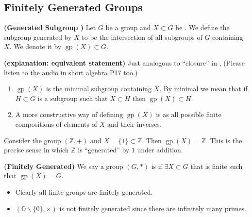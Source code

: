 \documentclass{article}
\newcommand{\bfs}[1]{\textbf{({#1}) }}
\newcommand{\gp}{\operatorname{gp}}
\begin{document}
\subsection{Finitely Generated Groups}\label{sec:finite}
\begin{defa}{\bfs{Generated Subgroup }}
    Let $G$ be a group and $X \subset G$ be . We define the subgroup generated by ${X}$ to be the intersection of all subgroups of $G$ containing $X .$ We denote it by $\gp(X) \subset G$.
\end{defa} 
\begin{rema}{\bfs{explanation: equivalent statement}} Just analogous to ``closure'' in \cite{rudin1976principles}, (Please listen to the audio in short algebra P17 too.)
\begin{enumerate}
    \item  $\gp(X)$ is the minimal subgroup containing $X .$ By minimal we mean that if $H \subset G$ is a subgroup such that $X \subset H$ then $\gp(X) \subset H$.
\item A more constructive way of defining $\gp(X)$ is as all possible finite compositions of elements of $X$ and their inverses.
\end{enumerate}

\end{rema}

\begin{exma}
Consider the group $(\mathbb{Z},+)$ and $X=\{1\} \subset \mathbb{Z} .$ Then $\gp(X)=\mathbb{Z} .$ This is the precise sense in which $\mathbb{Z}$ is ``generated'' by $1$ under addition.
\end{exma}

\begin{defa}{\bfs{Finitely Generated}}
    We say a group $(G, *)$ is  if $\exists X \subset G$ that is finite such that $\gp(X)=G$.
\end{defa}

\begin{rema}\text{ }
\begin{itemize}
    \item Clearly all finite groups are finitely generated.
    \item $(\mathbb{Q} \backslash\{0\}, \times)$ is not finitely generated since there are infinitely many primes. 
\end{itemize}
\end{rema} 
\end{document}
